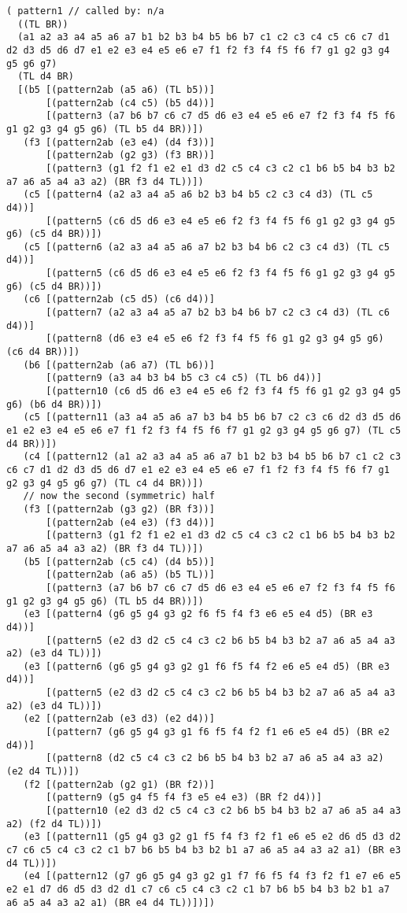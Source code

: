 {\begin{verbatim}
( pattern1 // called by: n/a
  ((TL BR))
  (a1 a2 a3 a4 a5 a6 a7 b1 b2 b3 b4 b5 b6 b7 c1 c2 c3 c4 c5 c6 c7 d1 d2 d3 d5 d6 d7 e1 e2 e3 e4 e5 e6 e7 f1 f2 f3 f4 f5 f6 f7 g1 g2 g3 g4 g5 g6 g7)
  (TL d4 BR)
  [(b5 [(pattern2ab (a5 a6) (TL b5))]
       [(pattern2ab (c4 c5) (b5 d4))]
       [(pattern3 (a7 b6 b7 c6 c7 d5 d6 e3 e4 e5 e6 e7 f2 f3 f4 f5 f6 g1 g2 g3 g4 g5 g6) (TL b5 d4 BR))])
   (f3 [(pattern2ab (e3 e4) (d4 f3))]
       [(pattern2ab (g2 g3) (f3 BR))]
       [(pattern3 (g1 f2 f1 e2 e1 d3 d2 c5 c4 c3 c2 c1 b6 b5 b4 b3 b2 a7 a6 a5 a4 a3 a2) (BR f3 d4 TL))])
   (c5 [(pattern4 (a2 a3 a4 a5 a6 b2 b3 b4 b5 c2 c3 c4 d3) (TL c5 d4))]
       [(pattern5 (c6 d5 d6 e3 e4 e5 e6 f2 f3 f4 f5 f6 g1 g2 g3 g4 g5 g6) (c5 d4 BR))])
   (c5 [(pattern6 (a2 a3 a4 a5 a6 a7 b2 b3 b4 b6 c2 c3 c4 d3) (TL c5 d4))]
       [(pattern5 (c6 d5 d6 e3 e4 e5 e6 f2 f3 f4 f5 f6 g1 g2 g3 g4 g5 g6) (c5 d4 BR))])
   (c6 [(pattern2ab (c5 d5) (c6 d4))]
       [(pattern7 (a2 a3 a4 a5 a7 b2 b3 b4 b6 b7 c2 c3 c4 d3) (TL c6 d4))]
       [(pattern8 (d6 e3 e4 e5 e6 f2 f3 f4 f5 f6 g1 g2 g3 g4 g5 g6) (c6 d4 BR))])
   (b6 [(pattern2ab (a6 a7) (TL b6))]
       [(pattern9 (a3 a4 b3 b4 b5 c3 c4 c5) (TL b6 d4))]
       [(pattern10 (c6 d5 d6 e3 e4 e5 e6 f2 f3 f4 f5 f6 g1 g2 g3 g4 g5 g6) (b6 d4 BR))])
   (c5 [(pattern11 (a3 a4 a5 a6 a7 b3 b4 b5 b6 b7 c2 c3 c6 d2 d3 d5 d6 e1 e2 e3 e4 e5 e6 e7 f1 f2 f3 f4 f5 f6 f7 g1 g2 g3 g4 g5 g6 g7) (TL c5 d4 BR))])
   (c4 [(pattern12 (a1 a2 a3 a4 a5 a6 a7 b1 b2 b3 b4 b5 b6 b7 c1 c2 c3 c6 c7 d1 d2 d3 d5 d6 d7 e1 e2 e3 e4 e5 e6 e7 f1 f2 f3 f4 f5 f6 f7 g1 g2 g3 g4 g5 g6 g7) (TL c4 d4 BR))])
   // now the second (symmetric) half
   (f3 [(pattern2ab (g3 g2) (BR f3))]
       [(pattern2ab (e4 e3) (f3 d4))]
       [(pattern3 (g1 f2 f1 e2 e1 d3 d2 c5 c4 c3 c2 c1 b6 b5 b4 b3 b2 a7 a6 a5 a4 a3 a2) (BR f3 d4 TL))])
   (b5 [(pattern2ab (c5 c4) (d4 b5))]
       [(pattern2ab (a6 a5) (b5 TL))]
       [(pattern3 (a7 b6 b7 c6 c7 d5 d6 e3 e4 e5 e6 e7 f2 f3 f4 f5 f6 g1 g2 g3 g4 g5 g6) (TL b5 d4 BR))])
   (e3 [(pattern4 (g6 g5 g4 g3 g2 f6 f5 f4 f3 e6 e5 e4 d5) (BR e3 d4))]
       [(pattern5 (e2 d3 d2 c5 c4 c3 c2 b6 b5 b4 b3 b2 a7 a6 a5 a4 a3 a2) (e3 d4 TL))])
   (e3 [(pattern6 (g6 g5 g4 g3 g2 g1 f6 f5 f4 f2 e6 e5 e4 d5) (BR e3 d4))]
       [(pattern5 (e2 d3 d2 c5 c4 c3 c2 b6 b5 b4 b3 b2 a7 a6 a5 a4 a3 a2) (e3 d4 TL))])
   (e2 [(pattern2ab (e3 d3) (e2 d4))]
       [(pattern7 (g6 g5 g4 g3 g1 f6 f5 f4 f2 f1 e6 e5 e4 d5) (BR e2 d4))]
       [(pattern8 (d2 c5 c4 c3 c2 b6 b5 b4 b3 b2 a7 a6 a5 a4 a3 a2) (e2 d4 TL))])
   (f2 [(pattern2ab (g2 g1) (BR f2))]
       [(pattern9 (g5 g4 f5 f4 f3 e5 e4 e3) (BR f2 d4))]
       [(pattern10 (e2 d3 d2 c5 c4 c3 c2 b6 b5 b4 b3 b2 a7 a6 a5 a4 a3 a2) (f2 d4 TL))])
   (e3 [(pattern11 (g5 g4 g3 g2 g1 f5 f4 f3 f2 f1 e6 e5 e2 d6 d5 d3 d2 c7 c6 c5 c4 c3 c2 c1 b7 b6 b5 b4 b3 b2 b1 a7 a6 a5 a4 a3 a2 a1) (BR e3 d4 TL))])
   (e4 [(pattern12 (g7 g6 g5 g4 g3 g2 g1 f7 f6 f5 f4 f3 f2 f1 e7 e6 e5 e2 e1 d7 d6 d5 d3 d2 d1 c7 c6 c5 c4 c3 c2 c1 b7 b6 b5 b4 b3 b2 b1 a7 a6 a5 a4 a3 a2 a1) (BR e4 d4 TL))])])
\end{verbatim}}
